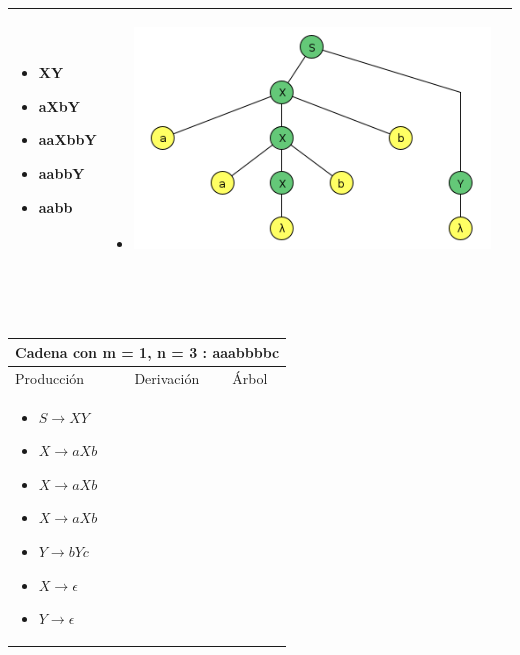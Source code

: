 \documentclass{article}
\begin{document}
\begin{enumerate} [(a)]
\begin{tabular}{|p{3.5cm}|p{3.5cm}|p{8cm}|  }
\begin{itemize}[label={}]
             
         \item	XY 
         \item	aXbY 
         \item	aaXbbY 
         \item	aabbY 
         \item	aabb 
         
         
        \end{itemize}
        &
         \begin{itemize}[label={}]
             \item \includegraphics[scale=0.40]{img/2g-aabb.png}
        \end{itemize}
        
         
         \\ \hline
        \end{tabular}
        \\ \\
        \begin{tabular}{|p{3.5cm}|p{3.5cm}|p{8cm}|  }
         \hline
         \multicolumn{3}{|c|}{Cadena con m = 1, n = 3 : aaabbbbc} \\
         \hline
         Producción & Derivación & Árbol\\
         \hline
         \begin{itemize}[label={}]
             
             \item $ S \to XY$	
         \item $ X \to aXb$ 
         \item $ X \to aXb$ 
         \item $ X \to aXb$ 
         \item $ Y \to bYc$ 
         \item $ X \to \epsilon$ 
         \item $ Y \to \epsilon$ 
         

\end{itemize}
\end{tabular}
\end{enumerate}
\end{document}
